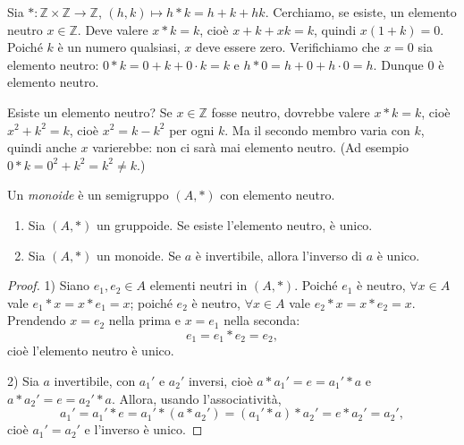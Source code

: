 \documentclass[11pt,a4paper]{article}
\begin{document}
\begin{esempio}[$h * k = h + k + hk$ su $\mathbb{Z}$]
Sia $* : \mathbb{Z}\times\mathbb{Z} \to \mathbb{Z}$, $(h, k) \mapsto h * k = h + k + hk$. Cerchiamo, se esiste, un elemento neutro $x \in \mathbb{Z}$. Deve valere $x * k = k$, cioè $x + k + xk = k$, quindi $x(1 + k) = 0$. Poiché $k$ è un numero qualsiasi, $x$ deve essere zero. Verifichiamo che $x = 0$ sia elemento neutro: $0 * k = 0 + k + 0\cdot k = k$ e $h * 0 = h + 0 + h\cdot 0 = h$. Dunque $0$ è elemento neutro.
\end{esempio}

\begin{esempio}[$h * k = h^2 + k^2$ su $\mathbb{Z}$]
Esiste un elemento neutro? Se $x \in \mathbb{Z}$ fosse neutro, dovrebbe valere $x * k = k$, cioè $x^2 + k^2 = k$, cioè $x^2 = k - k^2$ per ogni $k$. Ma il secondo membro varia con $k$, quindi anche $x$ varierebbe: non ci sarà mai elemento neutro. (Ad esempio $0 * k = 0^2 + k^2 = k^2 \neq k$.)
\end{esempio}

\begin{definizione}[Monoide]
Un \emph{monoide} è un semigruppo $(A, *)$ con elemento neutro.
\end{definizione}

\begin{proposizione}
\begin{enumerate}
  \item Sia $(A, *)$ un gruppoide. Se esiste l'elemento neutro, è unico.
  \item Sia $(A, *)$ un monoide. Se $a$ è invertibile, allora l'inverso di $a$ è unico.
\end{enumerate}
\end{proposizione}

\begin{proof}
1) Siano $e_1, e_2 \in A$ elementi neutri in $(A, *)$. Poiché $e_1$ è neutro, $\forall x \in A$ vale $e_1 * x = x * e_1 = x$; poiché $e_2$ è neutro, $\forall x \in A$ vale $e_2 * x = x * e_2 = x$. Prendendo $x = e_2$ nella prima e $x = e_1$ nella seconda:
\[
  e_1 = e_1 * e_2 = e_2 ,
\]
cioè l'elemento neutro è unico.

2) Sia $a$ invertibile, con $a_1'$ e $a_2'$ inversi, cioè $a * a_1' = e = a_1' * a$ e $a * a_2' = e = a_2' * a$. Allora, usando l'associatività,
\[
  a_1' = a_1' * e = a_1' * (a * a_2') = (a_1' * a) * a_2' = e * a_2' = a_2' ,
\]
cioè $a_1' = a_2'$ e l'inverso è unico.
\end{proof}
\end{document}

